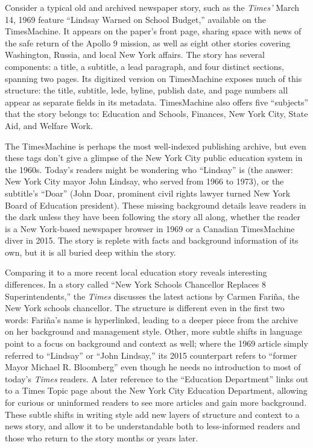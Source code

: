 Consider a typical old and archived newspaper story, such as the \emph{Times'} March 14, 1969 feature ``Lindsay Warned on School Budget,'' available on the TimesMachine. It appears on the paper's front page, sharing space with news of the safe return of the Apollo 9 mission, as well as eight other stories covering Washington, Russia, and local New York affairs. The story has several components: a title, a subtitle, a lead paragraph, and four distinct sections, spanning two pages. Its digitized version on TimesMachine exposes much of this structure: the title, subtitle, lede, byline, publish date, and page numbers all appear as separate fields in its metadata. TimesMachine also offers five ``subjects'' that the story belongs to: Education and Schools, Finances, New York City, State Aid, and Welfare Work.\autocite{bennett_lindsay_1969}

The TimesMachine is perhaps the most well-indexed publishing archive, but even these tags don't give a glimpse of the New York City public education system in the 1960s. Today's readers might be wondering who ``Lindsay'' is (the answer: New York City mayor John Lindsay, who served from 1966 to 1973), or the subtitle's ``Doar'' (John Doar, prominent civil rights lawyer turned New York Board of Education president). These missing background details leave readers in the dark unless they have been following the story all along, whether the reader is a New York-based newspaper browser in 1969 or a Canadian TimesMachine diver in 2015. The story is replete with facts and background information of its own, but it is all buried deep within the story.

Comparing it to a more recent local education story reveals interesting differences. In a story called ``New York Schools Chancellor Replaces 8 Superintendents,'' the \emph{Times} discusses the latest actions by Carmen Fari\~{n}a, the New York schools chancellor.\autocite{taylor_new_2014} The structure is different even in the first two words: Fari\~{n}a's name is hyperlinked, leading to a deeper piece from the archive on her background and management style. Other, more subtle shifts in language point to a focus on background and context as well; where the 1969 article simply referred to ``Lindsay'' or ``John Lindsay,'' its 2015 counterpart refers to ``former Mayor Michael R. Bloomberg'' even though he needs no introduction to most of today's \emph{Times} readers. A later reference to the ``Education Department'' links out to a Times Topic page about the New York City Education Department, allowing for curious or uninformed readers to see more articles and gain more background. These subtle shifts in writing style add new layers of structure and context to a news story, and allow it to be understandable both to less-informed readers and those who return to the story months or years later.

